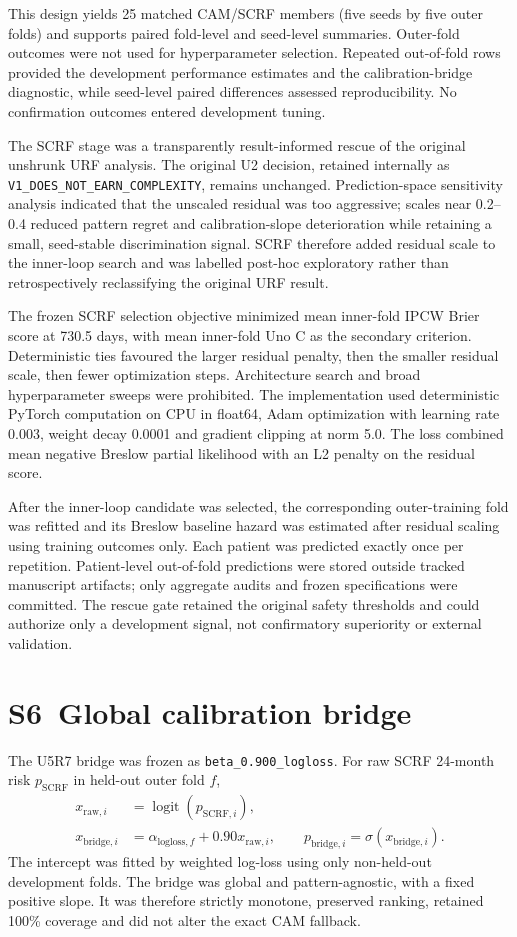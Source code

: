 \documentclass[pdflatex,sn-nature]{sn-jnl}
\begin{document}
This design yields 25 matched CAM/SCRF members (five seeds by five outer folds) and supports paired fold-level and seed-level summaries. Outer-fold outcomes were not used for hyperparameter selection. Repeated out-of-fold rows provided the development performance estimates and the calibration-bridge diagnostic, while seed-level paired differences assessed reproducibility. No confirmation outcomes entered development tuning.

The SCRF stage was a transparently result-informed rescue of the original unshrunk URF analysis. The original U2 decision, retained internally as \texttt{V1\_DOES\_NOT\_EARN\_COMPLEXITY}, remains unchanged. Prediction-space sensitivity analysis indicated that the unscaled residual was too aggressive; scales near 0.2--0.4 reduced pattern regret and calibration-slope deterioration while retaining a small, seed-stable discrimination signal. SCRF therefore added residual scale to the inner-loop search and was labelled post-hoc exploratory rather than retrospectively reclassifying the original URF result.

The frozen SCRF selection objective minimized mean inner-fold IPCW Brier score at 730.5 days, with mean inner-fold Uno C as the secondary criterion. Deterministic ties favoured the larger residual penalty, then the smaller residual scale, then fewer optimization steps. Architecture search and broad hyperparameter sweeps were prohibited. The implementation used deterministic PyTorch computation on CPU in float64, Adam optimization with learning rate 0.003, weight decay 0.0001 and gradient clipping at norm 5.0. The loss combined mean negative Breslow partial likelihood with an L2 penalty on the residual score.

After the inner-loop candidate was selected, the corresponding outer-training fold was refitted and its Breslow baseline hazard was estimated after residual scaling using training outcomes only. Each patient was predicted exactly once per repetition. Patient-level out-of-fold predictions were stored outside tracked manuscript artifacts; only aggregate audits and frozen specifications were committed. The rescue gate retained the original safety thresholds and could authorize only a development signal, not confirmatory superiority or external validation.

\section*{S6~Global calibration bridge}
The U5R7 bridge was frozen as \texttt{beta\_0.900\_logloss}. For raw SCRF 24-month risk $p_{\mathrm{SCRF}}$ in held-out outer fold $f$,
\begin{align}
x_{\mathrm{raw},i}&=\operatorname{logit}(p_{\mathrm{SCRF},i}),\\
x_{\mathrm{bridge},i}&=\alpha_{\mathrm{logloss},f}+0.90x_{\mathrm{raw},i},\qquad
p_{\mathrm{bridge},i}=\sigma(x_{\mathrm{bridge},i}).
\end{align}
The intercept was fitted by weighted log-loss using only non-held-out development folds. The bridge was global and pattern-agnostic, with a fixed positive slope. It was therefore strictly monotone, preserved ranking, retained 100\% coverage and did not alter the exact CAM fallback.
\end{document}
